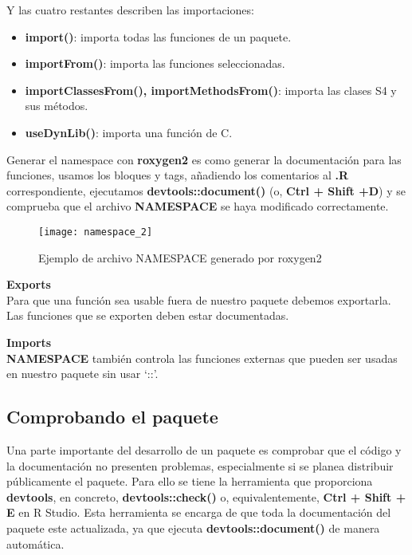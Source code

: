 Y las cuatro restantes describen las importaciones:
\begin{itemize}
    \item \textbf{import()}: importa todas las funciones de un paquete.
    \item \textbf{importFrom()}: importa las funciones seleccionadas.
    \item \textbf{importClassesFrom(), importMethodsFrom()}: importa las clases S4 y sus
m\'etodos.
    \item \textbf{useDynLib()}: importa una funci\'on de C.
\end{itemize}

Generar el namespace con \textbf{roxygen2} es como generar la documentaci\'on para las funciones,
usamos los bloques y tags, a\~nadiendo los comentarios al \textbf{.R} correspondiente, ejecutamos
\textbf{devtools::document()} (o, \textbf{Ctrl + Shift +D}) y se comprueba que el archivo \textbf{NAMESPACE} se
haya modificado correctamente.\\

\begin{figure}[H]
    \centering
    \texttt{[image: namespace\_2]}
    \caption{Ejemplo de archivo NAMESPACE generado por roxygen2 }
    \label{fig:namespace}
\end{figure} 

\textbf{Exports}\\
Para que una funci\'on sea usable fuera de nuestro paquete debemos exportarla. Las funciones que se exporten deben estar documentadas.

\textbf{Imports}\\
\textbf{NAMESPACE} tambi\'en controla las funciones externas que pueden ser usadas en nuestro
paquete sin usar \enquote*{::}.

\subsection{Comprobando el paquete}

Una parte importante del desarrollo de un paquete es comprobar que el c\'odigo y la
documentaci\'on no presenten problemas, especialmente si se planea distribuir p\'ublicamente
el paquete. Para ello se tiene la herramienta que proporciona \textbf{devtools}, en concreto,
\textbf{devtools::check()} o, equivalentemente, \textbf{Ctrl + Shift + E} en R Studio.
Esta herramienta se encarga de que toda la documentaci\'on del paquete este actualizada, ya
que ejecuta \textbf{devtools::document()} de manera autom\'atica.

